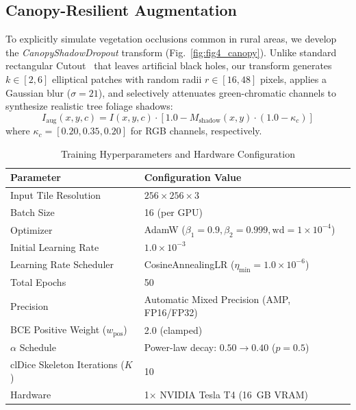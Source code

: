 \documentclass[conference]{IEEEtran}
\begin{document}
\subsection{Canopy-Resilient Augmentation}
To explicitly simulate vegetation occlusions common in rural areas, we develop the \textit{CanopyShadowDropout} transform (Fig.~\ref{fig:fig4_canopy}). Unlike standard rectangular Cutout~\cite{devries2017cutout} that leaves artificial black holes, our transform generates $k \in [2, 6]$ elliptical patches with random radii $r \in [16, 48]$ pixels, applies a Gaussian blur ($\sigma=21$), and selectively attenuates green-chromatic channels to synthesize realistic tree foliage shadows:
\begin{equation}
    I_{\text{aug}}(x, y, c) = I(x, y, c) \cdot \left[ 1.0 - M_{\text{shadow}}(x, y) \cdot (1.0 - \kappa_c) \right]
\end{equation}
where $\kappa_c = [0.20, 0.35, 0.20]$ for RGB channels, respectively.

\begin{table}[t]
\centering
\caption{Training Hyperparameters and Hardware Configuration}
\label{tab:hyperparams}
\begin{tabular}{ll}
\toprule
\textbf{Parameter} & \textbf{Configuration Value} \\
\midrule
Input Tile Resolution & $256 \times 256 \times 3$ \\
Batch Size & 16 (per GPU) \\
Optimizer & AdamW ($\beta_1=0.9, \beta_2=0.999, \text{wd}=1\times10^{-4}$) \\
Initial Learning Rate & $1.0 \times 10^{-3}$ \\
Learning Rate Scheduler & CosineAnnealingLR ($\eta_{\text{min}}=1.0\times10^{-6}$) \\
Total Epochs & 50 \\
Precision & Automatic Mixed Precision (AMP, FP16/FP32) \\
BCE Positive Weight ($w_{\text{pos}}$) & 2.0 (clamped) \\
$\alpha$ Schedule & Power-law decay: $0.50 \to 0.40$ ($p=0.5$) \\
clDice Skeleton Iterations ($K$) & 10 \\
Hardware & 1$\times$ NVIDIA Tesla T4 (16~GB VRAM) \\
\bottomrule
\end{tabular}
\end{table}

\end{document}
